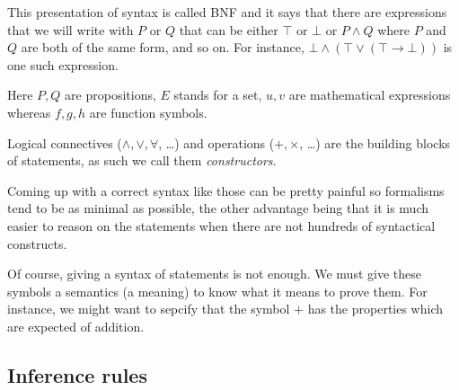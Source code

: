 This presentation of syntax is called \acrfull{BNF} and it says that there are
expressions that we will write with \(P\) or \(Q\) that can be either \(\top\)
or \(\bot\) or \(P \wedge Q\) where \(P\) and \(Q\) are both of the same form,
and so on.
For instance, \(\bot \wedge (\top \vee (\top \to \bot))\) is one such
expression.

Here \(P,Q\) are propositions, \(E\) stands for a set, \(u,v\) are mathematical
expressions whereas \(f,g,h\) are function symbols.

Logical connectives (\(\wedge, \vee, \forall\), \dots) and operations
(\(+, \times\), \dots) are the building blocks of statements, as such we call
them \emph{constructors}.

Coming up with a correct syntax like those can be pretty painful so formalisms
tend to be as minimal as possible, the other advantage being that it is much
easier to reason on the statements when there are not hundreds of syntactical
constructs.

Of course, giving a syntax of statements is not enough. We must give these
symbols a semantics (\ie a meaning) to know what it means to prove them.
For instance, we might want to sepcify that the symbol \(+\) has the properties
which are expected of addition.

\subsection{Inference rules}

